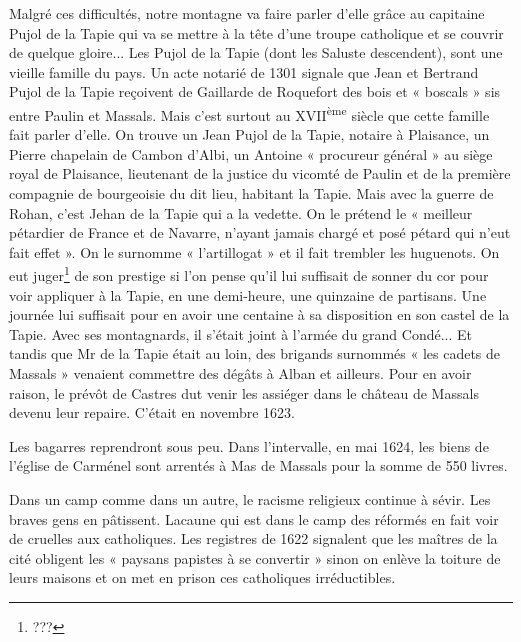 Malgré ces difficultés, notre montagne va faire parler d'elle grâce
au capitaine Pujol de la Tapie qui va se mettre à la tête d'une troupe
catholique et se couvrir de quelque gloire... Les Pujol de la Tapie
(dont les Saluste descendent), sont une vieille famille du pays.
Un acte notarié de 1301 signale que Jean et Bertrand Pujol de la
Tapie reçoivent de Gaillarde de Roquefort des bois et « boscals »
sis entre Paulin et Massals. Mais c'est surtout au XVII\textsuperscript{ème}
siècle que cette famille fait parler d'elle. On trouve un Jean Pujol
de la Tapie, notaire à Plaisance, un Pierre chapelain de Cambon d'Albi,
un Antoine « procureur général » au siège royal de Plaisance,
lieutenant de la justice du vicomté de Paulin et de la première
compagnie de bourgeoisie du dit lieu, habitant la Tapie. Mais avec
la guerre de Rohan, c'est Jehan de la Tapie qui a la vedette. On le
prétend le « meilleur pétardier de France et de Navarre, n'ayant
jamais chargé et posé pétard qui n'eut fait effet ». On le surnomme
« l'artillogat » et il fait trembler les huguenots. On eut juger\footnote{???} de
son prestige si l'on pense qu'il lui suffisait de sonner du cor pour
voir appliquer à la Tapie, en une demi-heure, une quinzaine de
partisans. Une journée lui suffisait pour en avoir une centaine à
sa disposition en son castel de la Tapie. Avec ses montagnards,
il s'était joint à l'armée du grand Condé... Et tandis que Mr de
la Tapie était au loin, des brigands surnommés « les cadets de
Massals » venaient commettre des dégâts à Alban et ailleurs.
Pour en avoir raison, le prévôt de Castres dut venir les assiéger
dans le château de Massals devenu leur repaire. C'était en
novembre 1623.

Les bagarres reprendront sous peu. Dans l'intervalle, en mai 1624,
les biens de l'église de Carménel sont arrentés à Mas de Massals
pour la somme de 550 livres.

Dans un camp comme dans un autre, le racisme religieux continue
à sévir. Les braves gens en pâtissent. Lacaune qui est dans le
camp des réformés en fait voir de cruelles aux catholiques.
Les registres de 1622 signalent que les maîtres de la cité obligent
les « paysans papistes à se convertir » sinon on enlève la toiture
de leurs maisons et on met en prison ces catholiques irréductibles.